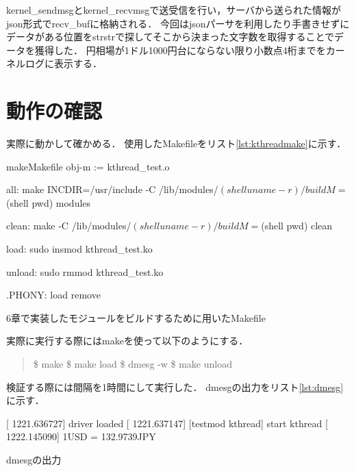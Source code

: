 kernel_sendmsgとkernel_recvmsgで送受信を行い，サーバから送られた情報がjson形式でrecv_bufに格納される．
今回はjsonパーサを利用したり手書きせずにデータがある位置をstrstrで探してそこから決まった文字数を取得することでデータを獲得した．
円相場が1ドル1000円台にならない限り小数点4桁までをカーネルログに表示する．


\section{動作の確認}
実際に動かして確かめる．
使用したMakefileをリスト\ref{lst:kthreadmake}に示す．
\begin{longlisting}
\begin{myminted}{make}{Makefile}
obj-m := kthread_test.o

all:
	make INCDIR=/usr/include -C /lib/modules/$(shell uname -r)/build M=$(shell pwd) modules

clean:
	make -C /lib/modules/$(shell uname -r)/build M=$(shell pwd) clean

load:
	sudo insmod kthread_test.ko

unload:
	sudo rmmod kthread_test.ko

.PHONY: load remove
\end{myminted}
\caption{6章で実装したモジュールをビルドするために用いたMakefile}
\label{lst:kthreadmake}
\end{longlisting}

実際に実行する際にはmakeを使って以下のようにする．
\begin{quote}
\$ make
\$ make load
\$ dmesg -w
\$ make unload
\end{quote}

検証する際には間隔を1時間にして実行した．
dmesgの出力をリスト\ref{lst:dmesg}に示す．
\begin{longlisting}
\begin{myminted}{}{}
[ 1221.636727] driver loaded
[ 1221.637147] [testmod kthread] start kthread
[ 1222.145090] 1USD = 132.9739JPY
\end{myminted}
\caption{dmesgの出力}
\label{lst:dmesg}
\end{longlisting}
